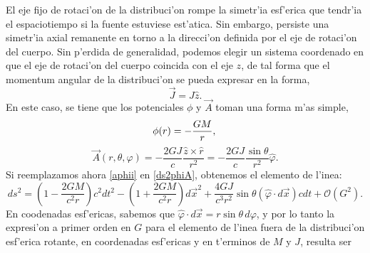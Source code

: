 El eje fijo de rotaci'on de la distribuci'on rompe la simetr'ia esf'erica que tendr'ia el espaciotiempo si la fuente estuviese est'atica. Sin embargo, persiste una simetr'ia axial remanente  en torno a la direcci'on definida por el eje de rotaci'on del cuerpo. Sin p'erdida de generalidad, podemos elegir un sistema coordenado en que el eje de rotaci'on del cuerpo coincida con el eje $z$, de tal forma que el momentum angular de la distribuci'on se pueda expresar en la forma,
\begin{equation}
\vec{J}=J\hat{z}.
\end{equation}
En este caso, se tiene que los potenciales $\phi$ y $\vec{A}$ toman una forma m'as simple,
\begin{equation}
\phi(r) = -\frac{GM}{r},\label{phiii}\\
\end{equation}
\begin{equation}
\vec{A}(r,\theta,\varphi ) = -\frac{2GJ}{c}\frac{\hat{z}\times\hat{r}}{r^2}
=-\frac{2GJ}{c}\frac{\sin \theta }{r^2}\hat{\varphi}%
.\label{aphii}
\end{equation}
Si reemplazamos ahora \eqref{aphii} en \eqref{ds2phiA}, obtenemos el elemento de l'inea:
\begin{equation}
ds^2=\left(1-\frac{2GM}{c^2r}\right)c^2dt^2-\left(1+\frac{2GM}{c^2r}\right)d\vec{x}^2+\frac{4GJ}{c^3r^2}\sin\theta (\hat\varphi\cdot d\vec{x})cdt+\mathcal{O}(G^2).\label{ds22}
\end{equation}
En coodenadas esf'ericas, sabemos que $\hat\varphi\cdot d\vec{x}=r\sin\theta\,d\varphi$, y por lo tanto la expresi'on a primer orden en $G$ para el elemento de l'inea fuera de la distribuci'on esf'erica rotante, en coordenadas esf'ericas y en t'erminos de $M$ y $J$, resulta ser

